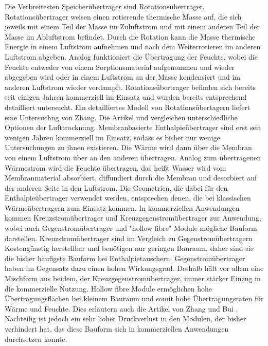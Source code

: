 \begin{normalsize}
\begin{LARGE}
Die Verbreitesten Speicherübertrager sind Rotationsübertrager. Rotationsübertrager weisen einen rotierende thermische Masse auf, die sich jeweils mit einem Teil der Masse im Zuluftstrom und mit einem anderen Teil der Masse im Abluftstrom befindet. Durch die Rotation kann die Masse thermische Energie in einem Luftstrom aufnehmen und nach dem Weiterrotieren im anderen Luftstrom abgeben. Analog funktioniert die Übertragung der Feuchte, wobei die Feuchte entweder von einem Sorptionsmaterial aufgenommen und wieder abgegeben wird oder in einem Luftstrom an der Masse kondensiert und im anderen Luftstrom wieder verdampft. Rotationsübertrager befinden sich bereits seit einigen Jahren kommerziell im Einsatz und wurden bereits entsprechend detailliert untersucht. Ein detailliertes Modell von Rotationsübertagern liefert eine Untersuchng von Zhang\cite{Zhang.2002}. Die Artikel \cite{Zhang.2006} und \cite{JustoAlonso.2015} vergleichen unterschiedliche Optionen der Lufttrocknung.
Membranbasierte Enthalpieübertrager sind erst seit wenigen Jahren kommerziell im Einsatz, sodass es bisher nur wenige Untersuchungen zu ihnen existieren. Die Wärme wird dann über die Membran von einem Luftstrom über an den anderen übertragen. Analog zum übertragenen Wärmestrom wird die Feuchte übertragen, das heißt Wasser wird vom Membranmaterial absorbiert, diffundiert durch die Membran und desorbiert auf der anderen Seite in den Luftstrom. Die Geometrien, die dabei für den Enthalpieübertrager verwendet werden, entsprechen denen, die bei klassischen Wärmeübertragern zum Einsatz kommen. In kommerziellen Anwendungen kommen Kreuzstromübertrager und Kreuzgegenstromübertrager zur Anwendung, wobei auch Gegenstromübertrager und "hollow fibre" Module mögliche Bauform darstellen. Kreuzstromübertrager sind im Vergleich zu Gegenstromübertragern Kostengünstig herstellbar und benötigen nur geringen Bauraum, daher sind sie die bisher häufigste Bauform bei Enthalpietauschern. Gegenstromübertrager haben im Gegensatz dazu einen hohen Wirkungsgrad. Deshalb hält vor allem eine Mischform aus beidem, der Kreuzgegenstromübertrager, immer stärker Einzug in die kommerzielle Nutzung. Hollow fibre Module ermöglichen hohe Übertragungsflächen bei kleinem Bauraum und somit hohe Übertragungsraten für Wärme und Feuchte. Dies erläutern auch die Artikel von Zhang und Bui \cite{Zhang.2010} \cite{Bui.2010}. Nachteilig ist jedoch ein sehr hoher Druckverlust in den Modulen, der bisher verhindert hat, das diese Bauform sich in kommerziellen Anwendungen durchsetzen konnte. 


\end{LARGE}
\end{normalsize}
